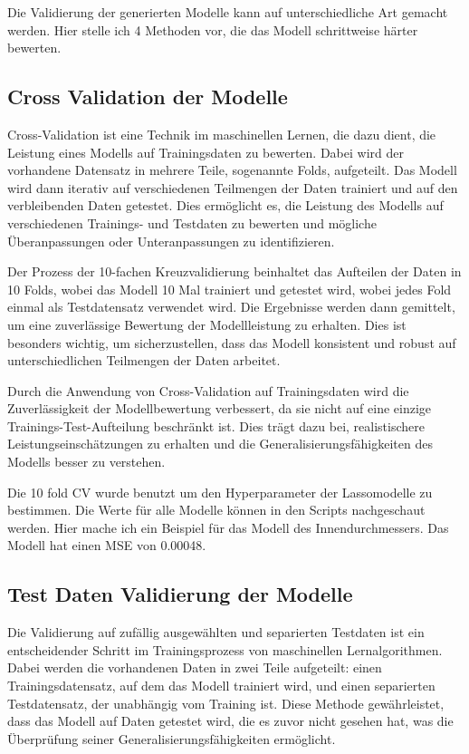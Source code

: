 Die Validierung der generierten Modelle kann auf unterschiedliche Art gemacht werden. Hier stelle ich 4 Methoden vor, die das Modell schrittweise härter bewerten.

\subsection{Cross Validation der Modelle}
Cross-Validation ist eine Technik im maschinellen Lernen, die dazu dient, die Leistung eines Modells auf Trainingsdaten zu bewerten. Dabei wird der vorhandene Datensatz in mehrere Teile, sogenannte Folds, aufgeteilt. Das Modell wird dann iterativ auf verschiedenen Teilmengen der Daten trainiert und auf den verbleibenden Daten getestet. Dies ermöglicht es, die Leistung des Modells auf verschiedenen Trainings- und Testdaten zu bewerten und mögliche Überanpassungen oder Unteranpassungen zu identifizieren.

Der Prozess der 10-fachen Kreuzvalidierung beinhaltet das Aufteilen der Daten in 10 Folds, wobei das Modell 10 Mal trainiert und getestet wird, wobei jedes Fold einmal als Testdatensatz verwendet wird. Die Ergebnisse werden dann gemittelt, um eine zuverlässige Bewertung der Modellleistung zu erhalten. Dies ist besonders wichtig, um sicherzustellen, dass das Modell konsistent und robust auf unterschiedlichen Teilmengen der Daten arbeitet.

Durch die Anwendung von Cross-Validation auf Trainingsdaten wird die Zuverlässigkeit der Modellbewertung verbessert, da sie nicht auf eine einzige Trainings-Test-Aufteilung beschränkt ist. Dies trägt dazu bei, realistischere Leistungseinschätzungen zu erhalten und die Generalisierungsfähigkeiten des Modells besser zu verstehen.

Die 10 fold CV wurde benutzt um den Hyperparameter der Lassomodelle zu bestimmen. Die Werte für alle Modelle können in den Scripts nachgeschaut werden. Hier mache ich ein Beispiel für das Modell des Innendurchmessers. Das Modell hat einen MSE von 0.00048.

\subsection{Test Daten Validierung der Modelle}
Die Validierung auf zufällig ausgewählten und separierten Testdaten ist ein entscheidender Schritt im Trainingsprozess von maschinellen Lernalgorithmen. Dabei werden die vorhandenen Daten in zwei Teile aufgeteilt: einen Trainingsdatensatz, auf dem das Modell trainiert wird, und einen separierten Testdatensatz, der unabhängig vom Training ist. Diese Methode gewährleistet, dass das Modell auf Daten getestet wird, die es zuvor nicht gesehen hat, was die Überprüfung seiner Generalisierungsfähigkeiten ermöglicht.

